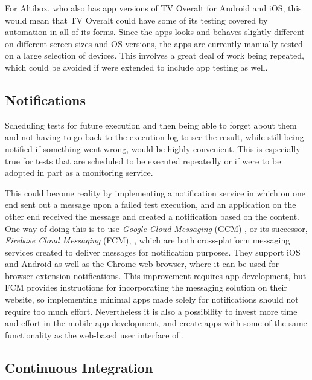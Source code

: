 For Altibox, who also has app versions of TV Overalt for Android and iOS, this would mean that TV Overalt could have some of its testing covered by automation in all of its forms. Since the apps looks and behaves slightly different on different screen sizes and OS versions, the apps are currently manually tested on a large selection of devices. This involves a great deal of work being repeated, which could be avoided if \toolname \space were extended to include app testing as well.
    
\subsection{Notifications}

Scheduling tests for future execution and then being able to forget about them and not having to go back to the execution log to see the result, while still being notified if something went wrong, would be highly convenient. This is especially true for tests that are scheduled to be executed repeatedly or if \toolname \space were to be adopted in part as a monitoring service.

This could become reality by implementing a notification service in which \toolname \space on one end sent out a message upon a failed test execution, and an application on the other end received the message and created a notification based on the content. One way of doing this is to use \emph{Google Cloud Messaging} (GCM) \cite{gcm}, or its successor, \emph{Firebase Cloud Messaging} (FCM), \cite{fcm}, which are both cross-platform messaging services created to deliver messages for notification purposes. They support iOS and Android as well as the Chrome web browser, where it can be used for browser extension notifications. This improvement requires app development, but FCM provides instructions for incorporating the messaging solution on their website, so implementing minimal apps made solely for notifications should not require too much effort. Nevertheless it is also a possibility to invest more time and effort in the mobile app development, and create apps with some of the same functionality as the web-based user interface of \toolname.




\subsection{Continuous Integration}

